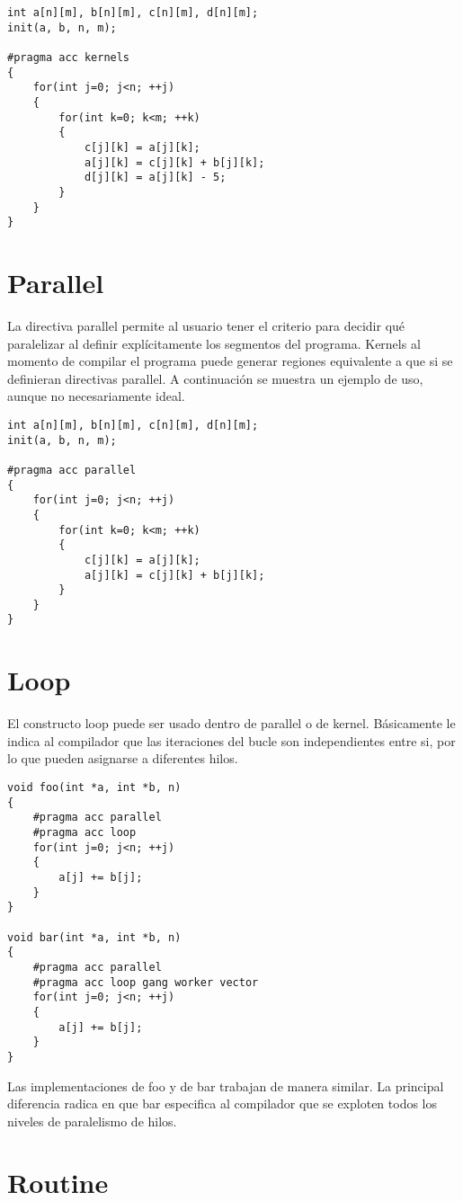 \begin{lstlisting}[style=CStyle]
int a[n][m], b[n][m], c[n][m], d[n][m];
init(a, b, n, m);

#pragma acc kernels
{
    for(int j=0; j<n; ++j)
    {
        for(int k=0; k<m; ++k)
        {
            c[j][k] = a[j][k];
            a[j][k] = c[j][k] + b[j][k];
            d[j][k] = a[j][k] - 5;
        }
    }
}
\end{lstlisting}

\section{Parallel}
La directiva parallel permite al usuario tener el criterio para decidir qué paralelizar al definir explícitamente los segmentos del programa. Kernels al momento de compilar el programa puede generar regiones equivalente a que si se definieran directivas parallel. A continuación se muestra un ejemplo de uso, aunque no necesariamente ideal.

\begin{lstlisting}[style=CStyle]
int a[n][m], b[n][m], c[n][m], d[n][m];
init(a, b, n, m);

#pragma acc parallel
{
    for(int j=0; j<n; ++j)
    {
        for(int k=0; k<m; ++k)
        {
            c[j][k] = a[j][k];
            a[j][k] = c[j][k] + b[j][k];
        }
    }
}
\end{lstlisting}

\section{Loop}
El constructo loop puede ser usado dentro de parallel o de kernel. Básicamente le indica al compilador que las iteraciones del bucle son independientes entre si, por lo que pueden asignarse a diferentes hilos.

\begin{lstlisting}[style=CStyle]
void foo(int *a, int *b, n)
{
    #pragma acc parallel
    #pragma acc loop
    for(int j=0; j<n; ++j)
    {
        a[j] += b[j];
    }
}

void bar(int *a, int *b, n)
{
    #pragma acc parallel
    #pragma acc loop gang worker vector
    for(int j=0; j<n; ++j)
    {
        a[j] += b[j];
    }
}

\end{lstlisting}

Las implementaciones de foo y de bar trabajan de manera similar. La principal diferencia radica en que bar especifica al compilador que se exploten todos los niveles de paralelismo de hilos.

\section{Routine}

\clearpage